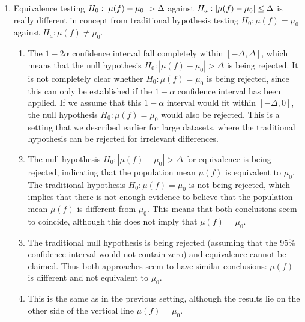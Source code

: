 \begin{enumerate}
    \item Equivalence testing $H_0 : \left| \mu( f ) - \mu_0 \right| > \Delta$ against $H_a : \left| \mu( f ) - \mu_0 \right| \leq \Delta$ is really different in concept from traditional hypothesis testing $H_0 : \mu( f ) = \mu_0$ against $H_a : \mu( f ) \neq \mu_0 $.
    \hfill \cite{statistics/book/Statistics-for-Data-Scientists/Maurits-Kaptein}
    \begin{enumerate}
        \item The $1 - 2\alpha$ confidence interval fall completely within $[-\Delta, \Delta]$, which means that the null hypothesis $H_0 : |\mu( f ) - \mu_0| > \Delta$ is being rejected. 
        It is not completely clear whether $H_0 : \mu( f ) = \mu_0$ is being rejected, since this can only be established if the $1 - \alpha$ confidence interval has been applied. 
        If we assume that this $1 - \alpha$ interval would fit within $[-\Delta, 0]$, the null hypothesis $H_0 : \mu( f ) = \mu_0$ would also be rejected. 
        This is a setting that we described earlier for large datasets, where the traditional hypothesis can be rejected for irrelevant differences.
        \hfill \cite{statistics/book/Statistics-for-Data-Scientists/Maurits-Kaptein}

        \item The null hypothesis $H_0 : |\mu( f ) - \mu_0| > \Delta$ for equivalence is being rejected, indicating that the population mean $\mu( f )$ is equivalent to $\mu_0 $. 
        The traditional hypothesis $H_0 : \mu( f ) = \mu_0$ is not being rejected, which implies that there is not enough evidence to believe that the population mean $\mu( f )$ is different from $\mu_0 $. 
        This means that both conclusions seem to coincide, although this does not imply that $\mu( f ) = \mu_0 $.
        \hfill \cite{statistics/book/Statistics-for-Data-Scientists/Maurits-Kaptein}

        \item The traditional null hypothesis is being rejected (assuming that the $95\%$ confidence interval would not contain zero) and equivalence cannot be claimed. 
        Thus both approaches seem to have similar conclusions: $\mu( f )$ is different and not equivalent to $\mu_0 $.
        \hfill \cite{statistics/book/Statistics-for-Data-Scientists/Maurits-Kaptein}

        \item This is the same as in the previous setting, although the results lie on the other side of the vertical line $\mu( f ) = \mu_0 $.
        \hfill \cite{statistics/book/Statistics-for-Data-Scientists/Maurits-Kaptein}


\end{enumerate}
\end{enumerate}
